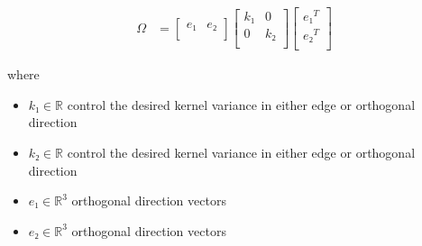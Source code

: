 \documentclass[12pt]{article}
\begin{document}
\begin{align*}
\textit{Ω} & = \begin{bmatrix}
\textit{e₁} & \textit{e₂}\\
\end{bmatrix}\begin{bmatrix}
\textit{k₁} & 0\\
0 & \textit{k₂}\\
\end{bmatrix}\begin{bmatrix}
\textit{e₁}^T\\
\textit{e₂}^T\\
\end{bmatrix}
\end{align*}

where
\begin{itemize}
\item $\textit{k₁} \in \mathbb{{R}}$ control the desired kernel variance in either edge or orthogonal direction
\item $\textit{k₂} \in \mathbb{{R}}$ control the desired kernel variance in either edge or orthogonal direction
\item $\textit{e₁} \in \mathbb{R}^{ 3}$ orthogonal direction vectors
\item $\textit{e₂} \in \mathbb{R}^{ 3}$ orthogonal direction vectors
\end{itemize}
\end{document}
